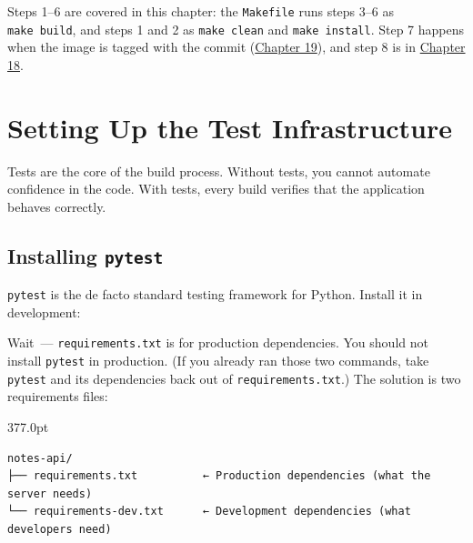 \noindent{}Steps 1--6 are covered in this chapter: the \texttt{Makefile} runs steps 3--6 as \texttt{make\ build}, and steps 1 and 2 as \texttt{make\ clean} and \texttt{make\ install}. Step 7 happens when the image is tagged with the commit (\hyperref[ch:19-artifact-storage]{Chapter 19}), and step 8 is in \hyperref[ch:18-containerization]{Chapter 18}.

\setcounter{section}{1}
\section{Setting Up the Test Infrastructure}\label{17-build-process:172-setting-up-the-test-infrastructure}

Tests are the core of the build process. Without tests, you cannot automate confidence in the code. With tests, every build verifies that the application behaves correctly.

\subsection*{\texorpdfstring{Installing \texttt{pytest}}{Installing pytest}}\label{17-build-process:installing-pytest}

\texttt{pytest} is the de facto standard testing framework for Python. Install it in development:

\begin{codebox}[short]

\begin{Shaded}
\begin{Highlighting}[]
\OperatorTok{\textgreater{}}
\end{Highlighting}
\end{Shaded}

\end{codebox}

\noindent{}Wait~--- \texttt{requirements.txt} is for production dependencies. You should not install \texttt{pytest} in production. (If you already ran those two commands, take \texttt{pytest} and its dependencies back out of \texttt{requirements.txt}.) The solution is two requirements files:

\begin{diagrambox}[short]{377.0pt}
\begin{Verbatim}[fontsize=\fontsize{9.0}{8.55}\selectfont]
notes-api/
├── requirements.txt          ← Production dependencies (what the server needs)
└── requirements-dev.txt      ← Development dependencies (what developers need)
\end{Verbatim}
\end{diagrambox}

